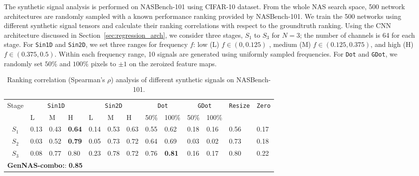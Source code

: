 \documentclass{article}
\begin{document}
The synthetic signal analysis is performed on NASBench-101 using CIFAR-10 dataset.
From the whole NAS search space, 500 network architectures are randomly sampled with a known performance ranking provided by NASBench-101.
We train the 500 networks using different synthetic signal tensors and calculate their ranking correlations with respect to the groundtruth ranking.
Using the CNN architecture discussed in Section~\ref{sec:regression_arch}, we consider three stages, $S_1$ to $S_3$ for $N=3$; the number of channels is 64 for each stage.
For \texttt{Sin1D} and \texttt{Sin2D}, we set three ranges for frequency $f$: low (L) $f \in (0 , 0.125)$ , medium (M) $f\in (0.125, 0.375)$, and high (H) $f\in (0.375, 0.5)$.
Within each frequency range, 10 signals are generated using uniformly sampled frequencies.
For \texttt{Dot} and \texttt{GDot}, we randomly set $50\%$ and $100\%$ pixels to $\pm 1$ on the zeroized feature maps.


\begin{table}
\vspace{-8pt}
\small
  \caption{Ranking correlation (Spearman's $\rho$) analysis of different synthetic signals on NASBench-101. }\label{table:signal_ablation}
  \centering
  \scriptsize
\begin{tabular}{cllllllllllll}
\toprule
\multirow{2}{*}{Stage} & \multicolumn{3}{c}{\texttt{Sin1D}} & \multicolumn{3}{c}{\texttt{Sin2D}} & \multicolumn{2}{c}{\texttt{Dot}} & \multicolumn{2}{c}{\texttt{GDot}} & \multirow{2}{*}{\texttt{Resize}} & \multirow{2}{*}{\texttt{Zero}}\\
\cmidrule(r){2-11}
                  &   L    &    M   &   H   &  L     &    M   &   H   &      50\%     &    100\%      &     50\%      &    100\%      &        &           \\
\midrule
$S_1$ & 0.13 & 0.43 & \textbf{0.64} & 0.14 & 0.53 & {0.63} & 0.55 & 0.62 & 0.18 & 0.16 & 0.56 & 0.17\\
$S_2$ & 0.03 & 0.52 & \textbf{0.79} & 0.05 & 0.73 & 0.72 & 0.64 & 0.69 & 0.03 & 0.02 & 0.73 & 0.18\\
$S_3$ & 0.08 & 0.77 & 0.80 & 0.23 & 0.78 & 0.72 & 0.76 & \textbf{0.81} & 0.16 & 0.17 & 0.80 & 0.22\\\midrule
\multicolumn{11}{l}{\textbf{GenNAS-combo:}: \textbf{0.85}} \\
\bottomrule
\end{tabular}
\vspace{-8pt}
\end{table}
\end{document}
